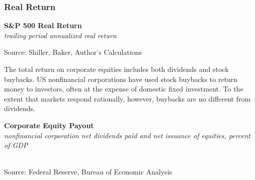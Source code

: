 \documentclass{report}
\makeatletter
\newcommand{\tbllink}[1]{\href{https://raw.githubusercontent.com/bdecon/US-chartbook/master/chartbook/data/#1}{\faTable}}
\newcommand*\short[1]{\expandafter\@gobbletwo\number\numexpr#1\relax}
\newcommand{\sbar}[4]{
		\addplot[ybar stacked, bar width=2.45pt, draw opacity=0, fill=#1] 
			table [x=#2, y=#3, col sep=comma]{#4};}
\newcommand{\dateaxisticks}{
		date coordinates in=x, axis line style={draw=none},
		xmax={2022-03-15},
		max space between ticks=40,	    
		xtick={{1990-01-01}, {1992-01-01}, {1994-01-01}, 
			{1996-01-01}, {1998-01-01}, {2000-01-01}, 
			{2002-01-01}, {2004-01-01}, {2006-01-01},
			{2008-01-01}, {2010-01-01}, {2012-01-01}, {2014-01-01},
		    {2016-01-01}, {2018-01-01}, {2020-01-01}, {2022-01-01}, 
		    {2024-01-01}, {2026-01-01}},
		minor xtick={{1989-01-01}, {1991-01-01}, {1993-01-01},
			{1995-01-01}, {1997-01-01}, {1999-01-01}, 
			{2001-01-01}, {2003-01-01}, {2005-01-01}, {2007-01-01},
		    {2009-01-01}, {2011-01-01}, {2013-01-01}, {2015-01-01},
		    {2017-01-01}, {2019-01-01}, {2021-01-01}, {2023-01-01}, 
		    {2025-01-01}, {2027-01-01}},
		enlarge y limits={0.06}, enlarge x limits={0.01},
		}
\newcommand{\bbar}[2]{extra #1 ticks = {{#2}}, extra #1 tick labels = ,
		extra #1 tick style = {grid=major, grid style={thick, black!25}},}
\newcommand{\thickline}[4]{\addplot[ultra thick, no markers, color=#1] 
		table [x=#2, y=#3, col sep=comma] {#4};	}
\newcommand{\rbars}{
		\fill[color=black!10] (axis cs:{1990-07-01},\pgfkeysvalueof{/pgfplots/ymin}) rectangle 
			(axis cs:{1991-03-01}, \pgfkeysvalueof{/pgfplots/ymax});
		\fill[color=black!10] (axis cs:{2007-12-01},\pgfkeysvalueof{/pgfplots/ymin}) rectangle 
			(axis cs:{2009-07-01}, \pgfkeysvalueof{/pgfplots/ymax});
		\fill[color=black!10] (axis cs:{2001-03-01},\pgfkeysvalueof{/pgfplots/ymin}) rectangle 
			(axis cs:{2001-11-01}, \pgfkeysvalueof{/pgfplots/ymax});
		\fill[color=black!10] (axis cs:{2020-02-01},\pgfkeysvalueof{/pgfplots/ymin}) rectangle 
			(axis cs:{2020-05-01}, \pgfkeysvalueof{/pgfplots/ymax});}
\makeatother
\begin{document}
{{\begin{minipage}{0.76\textwidth}
\subsubsection*{Real Return}
\small   
\vspace{2mm}

\normalsize \textbf{S\&P 500 Real Return}\\
\footnotesize{\textit{trailing period annualized real return}}
\vspace{3.5cm}

\hspace*{4mm} 

\footnotesize{Source: Shiller, Baker, Author's Calculations} \hfill \tbllink{sp500rr.csv}
\end{minipage}
\newpage
\begin{minipage}{0.76\textwidth}
\small The total return on corporate equities includes both dividends and stock buybacks. US nonfinancial corporations have used stock buybacks to return money to investors, often at the expense of domestic fixed investment. To the extent that markets respond rationally, however, buybacks are no different from dividends. 
\vspace{1mm}

\normalsize \textbf{Corporate Equity Payout}\\
\footnotesize{\textit{nonfinancial corporation net dividends paid and net issuance of equities, percent of GDP}}\\
\hspace*{-2mm} \\
\footnotesize{Source: Federal Reserve, Bureau of Economic Analysis} \hfill \tbllink{eq_payout.csv}


\end{minipage}}}
\end{document}
